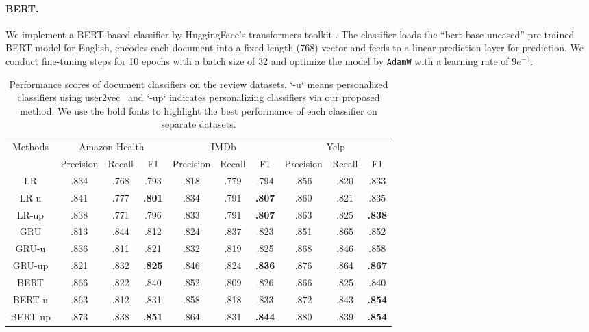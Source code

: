 \paragraph{BERT.} 
We implement a BERT-based classifier by HuggingFace's transformers toolkit \cite{Wolf2019HuggingFacesTS}. The classifier loads the ``bert-base-uncased'' pre-trained BERT model for English, encodes each document into a fixed-length (768) vector and feeds to a linear prediction layer for prediction.  We conduct fine-tuning steps for 10 epochs with a batch size of 32 and optimize the model by \texttt{AdamW} with a learning rate of 9$e^{-5}$. 



\begin{table}[t]
\centering
\begin{tabular}{c||ccc|ccc|ccc}
\multirow{2}{*}{Methods} & \multicolumn{3}{c|}{Amazon-Health} & \multicolumn{3}{c|}{IMDb} & \multicolumn{3}{c}{Yelp} \\
 & Precision & Recall & F1 & Precision & Recall & F1 & Precision & Recall & F1 \\\hline\hline
LR & .834 & .768 & .793 & .818 & .779 & .794 & .856 & .820 & .833 \\
LR-u & .841 & .777 & \textbf{.801} & .834 & .791 & \textbf{.807} & .860 & .821 & .835 \\
LR-up & .838 & .771 & .796 & .833 & .791 & \textbf{.807} & .863 & .825 & \textbf{.838} \\\hline
GRU & .813 & .844 & .812 & .824 & .837 & .823 & .851 & .865 & .852 \\
GRU-u & .836 & .811 & .821 & .832 & .819 & .825 & .868 & .846 & .858 \\
GRU-up & .821 & .832 & \textbf{.825} & .846 & .824 & \textbf{.836} & .876 & .864 & \textbf{.867} \\\hline
BERT & .866 & .822 & .840 & .852 & .809 & .826 & .866 & .825 & .840 \\
BERT-u & .863 & .812 & .831 & .858 & .818 & .833 & .872 & .843 & \textbf{.854} \\
BERT-up & .873 & .838 & \textbf{.851} & .864 & .831 & \textbf{.844} & .880 & .839 & \textbf{.854}
\end{tabular}
\caption{Performance scores of document classifiers on the review datasets. `-u` means personalized classifiers using user2vec~\cite{amir2017quantifying} and `-up` indicates personalizing classifiers via our proposed method. We use the bold fonts to highlight the best performance of each classifier on separate datasets.}
\label{chap4:tab:personalization}
\end{table}


